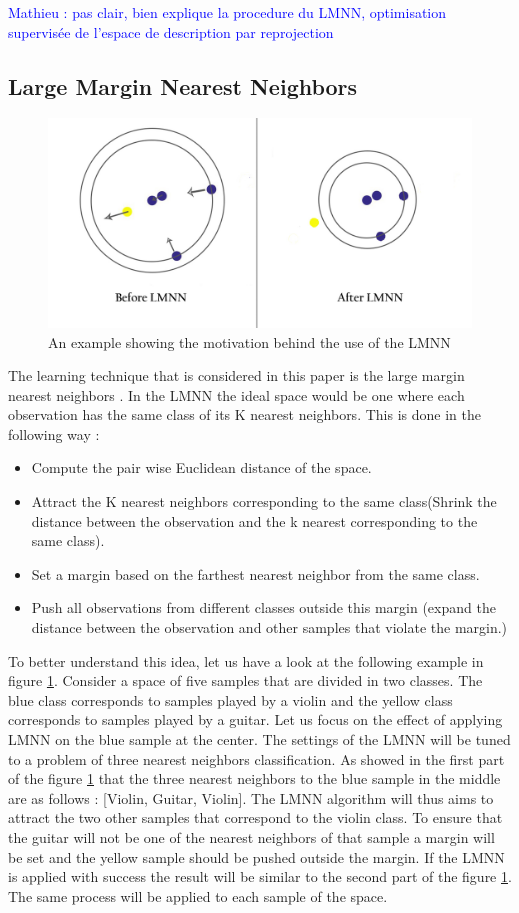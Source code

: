 \documentclass[hidelinks,12pt]{report}
\newcommand{\ml}[1]{\textcolor{blue}{ Mathieu : #1}}
\begin{document}
\ml{pas clair, bien explique la procedure du LMNN, optimisation supervisée de l'espace de description par reprojection}

\subsection{Large Margin Nearest Neighbors}
\begin{figure}[t!]
  
  \centering
	    \includegraphics[width=1\textwidth]{lmnn}
    \caption{An example showing the motivation behind the use of the LMNN}
    \label{LMNN}
\end{figure}
The learning technique that is considered in this paper is the large margin nearest neighbors \cite{W09}. In the LMNN the ideal space would be one where each observation has the same class of its K nearest neighbors. This is done in the following way :
\begin{itemize}
\item Compute the pair wise Euclidean distance of the space.
\item Attract the K nearest neighbors corresponding to the same class(Shrink the distance between the observation and the k nearest corresponding to the same class).
\item Set a margin based on the farthest nearest neighbor from the same class.
\item Push all observations from different classes outside this margin (expand the distance between the observation and other samples that violate the margin.)
\end{itemize}
To better understand this idea, let us have a look at the following example in figure \ref{LMNN}. Consider a space of five samples that are divided in two classes. The blue class corresponds to samples played by a violin and the yellow class corresponds to samples played by a guitar. Let us focus on the effect of applying LMNN on the blue sample at the center. The settings of the LMNN will be tuned to a problem of three nearest neighbors classification. As showed in the first part of the figure \ref{LMNN}  that the three nearest neighbors to the blue sample in the middle are as follows : [Violin, Guitar, Violin]. The LMNN algorithm will thus aims to attract the two other samples that correspond to the violin class. To ensure that the guitar will not be one of the nearest neighbors of that sample a margin will be set and the yellow sample should be pushed outside the margin. If the LMNN is applied with success the result will be similar to the second part of the figure \ref{LMNN}. The same process will be applied to each sample of the space.
\end{document}
